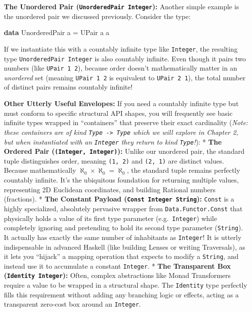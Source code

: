 \documentclass[
]{article}
\newenvironment{Shaded}{}{}
\newcommand{\DataTypeTok}[1]{\textcolor[rgb]{0.56,0.13,0.00}{#1}}
\newcommand{\KeywordTok}[1]{\textcolor[rgb]{0.00,0.44,0.13}{\textbf{#1}}}
\newcommand{\NormalTok}[1]{#1}
\newcommand{\OtherTok}[1]{\textcolor[rgb]{0.00,0.44,0.13}{#1}}
\begin{document}
\textbf{The Unordered Pair (\texttt{UnorderedPair\ Integer}):} Another
simple example is the unordered pair we discussed previously. Consider
the type:

\begin{Shaded}
\begin{Highlighting}[]
\KeywordTok{data} \DataTypeTok{UnorderedPair}\NormalTok{ a }\OtherTok{=} \DataTypeTok{UPair}\NormalTok{ a a}
\end{Highlighting}
\end{Shaded}

If we instantiate this with a countably infinite type like
\texttt{Integer}, the resulting type \texttt{UnorderedPair\ Integer} is
also countably infinite. Even though it pairs two numbers (like
\texttt{UPair\ 1\ 2}), because order doesn't mathematically matter in an
\emph{unordered} set (meaning \texttt{UPair\ 1\ 2} is equivalent to
\texttt{UPair\ 2\ 1}), the total number of distinct pairs remains
countably infinite!

\textbf{Other Utterly Useful Envelopes:} If you need a countably
infinite type but must conform to specific structural API shapes, you
will frequently see basic infinite types wrapped in ``containers'' that
preserve their exact cardinality (\emph{Note: these containers are of
kind \texttt{Type\ -\textgreater{}\ Type} which we will explore in
Chapter 2, but when instantiated with an \texttt{Integer} they return to
kind \texttt{Type}!}): * \textbf{The Ordered Pair
(\texttt{(Integer,\ Integer)}):} Unlike our unordered pair, the standard
tuple distinguishes order, meaning \texttt{(1,\ 2)} and \texttt{(2,\ 1)}
are distinct values. Because mathematically
\(\aleph_0 \times \aleph_0 = \aleph_0\), the standard tuple remains
perfectly countably infinite. It's the ubiquitous foundation for
returning multiple values, representing 2D Euclidean coordinates, and
building Rational numbers (fractions). * \textbf{The Constant Payload
(\texttt{Const\ Integer\ String}):} \texttt{Const} is a highly
specialized, absolutely pervasive wrapper from
\texttt{Data.Functor.Const} that physically holds a value of its first
type parameter (e.g.~\texttt{Integer}) while completely ignoring and
pretending to hold its second type parameter (\texttt{String}). It
actually has exactly the same number of inhabitants as \texttt{Integer}!
It is utterly indispensable in advanced Haskell (like building Lenses or
writing Traversals), as it lets you ``hijack'' a mapping operation that
expects to modify a \texttt{String}, and instead use it to accumulate a
constant \texttt{Integer}. * \textbf{The Transparent Box
(\texttt{Identity\ Integer}):} Often, complex abstractions like Monad
Transformers require a value to be wrapped in a structural shape. The
\texttt{Identity} type perfectly fills this requirement without adding
any branching logic or effects, acting as a transparent zero-cost box
around an \texttt{Integer}.
\end{document}

